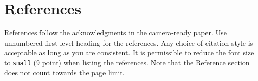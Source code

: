 \documentclass{article}
\begin{document}
\section*{References}


References follow the acknowledgments in the camera-ready paper. Use unnumbered first-level heading for
the references. Any choice of citation style is acceptable as long as you are
consistent. It is permissible to reduce the font size to \verb+small+ (9 point)
when listing the references.
Note that the Reference section does not count towards the page limit.
\medskip



% 









\end{document}
